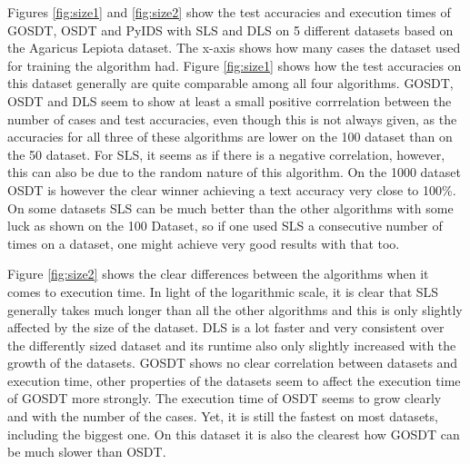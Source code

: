\documentclass[a4paper,preprint]{sig-alternate-xt}
\begin{document}
Figures \ref{fig:size1} and \ref{fig:size2} show the test accuracies and execution times of GOSDT, OSDT and PyIDS with SLS and DLS on 5 different datasets based on the Agaricus Lepiota dataset. The x-axis shows how many cases the dataset used for training the algorithm had. Figure \ref{fig:size1} shows how the test accuracies on this dataset generally are quite comparable among all four algorithms. GOSDT, OSDT and DLS seem to show at least a small positive corrrelation between the number of cases and test accuracies, even though this is not always given, as the accuracies for all three of these algorithms are lower on the 100 dataset than on the 50 dataset. For SLS, it seems as if there is a negative correlation, however, this can also be due to the random nature of this algorithm. On the 1000 dataset OSDT is however the clear winner achieving a text accuracy very close to 100\%. On some datasets SLS can be much better than the other algorithms with some luck as shown on the 100 Dataset, so if one used SLS a consecutive number of times on a dataset, one might achieve very good results with that too.

Figure \ref{fig:size2} shows the clear differences between the algorithms when it comes to execution time. In light of the logarithmic scale, it is clear that SLS generally takes much longer than all the other algorithms and this is only slightly affected by the size of the dataset. DLS is a lot faster and very consistent over the differently sized dataset and its runtime also only slightly increased with the growth of the datasets. GOSDT shows no clear correlation between datasets and execution time, other properties of the datasets seem to affect the execution time of GOSDT more strongly. The execution time of OSDT seems to grow clearly and with the number of the cases. Yet, it is still the fastest on most datasets, including the biggest one. On this dataset it is also the clearest how GOSDT can be much slower than OSDT.
\end{document}
